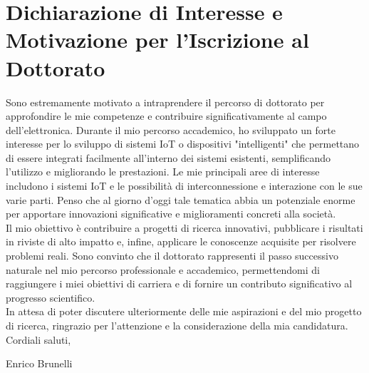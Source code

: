 \documentclass[]{report}
\begin{document}
\chapter*{Dichiarazione di Interesse e Motivazione per l'Iscrizione al Dottorato}
Sono estremamente motivato a intraprendere il percorso di dottorato per approfondire le mie competenze e contribuire significativamente al campo dell'elettronica. Durante il mio percorso accademico, ho sviluppato un forte interesse per lo sviluppo di sistemi IoT o dispositivi "intelligenti" che permettano di essere integrati facilmente all'interno dei sistemi esistenti, semplificando l'utilizzo e migliorando le prestazioni.
Le mie principali aree di interesse includono i sistemi IoT e le possibilità di interconnessione e interazione con le sue varie parti. Penso che al giorno d'oggi tale tematica abbia un potenziale enorme per apportare innovazioni significative e miglioramenti concreti alla società.
\\
Il mio obiettivo è contribuire a progetti di ricerca innovativi, pubblicare i risultati in riviste di alto impatto e, infine, applicare le conoscenze acquisite per risolvere problemi reali. Sono convinto che il dottorato rappresenti il passo successivo naturale nel mio percorso professionale e accademico, permettendomi di raggiungere i miei obiettivi di carriera e di fornire un contributo significativo al progresso scientifico.\\

In attesa di poter discutere ulteriormente delle mie aspirazioni e del mio progetto di ricerca, ringrazio per l'attenzione e la considerazione della mia candidatura.\\

Cordiali saluti,

Enrico Brunelli
\end{document}
